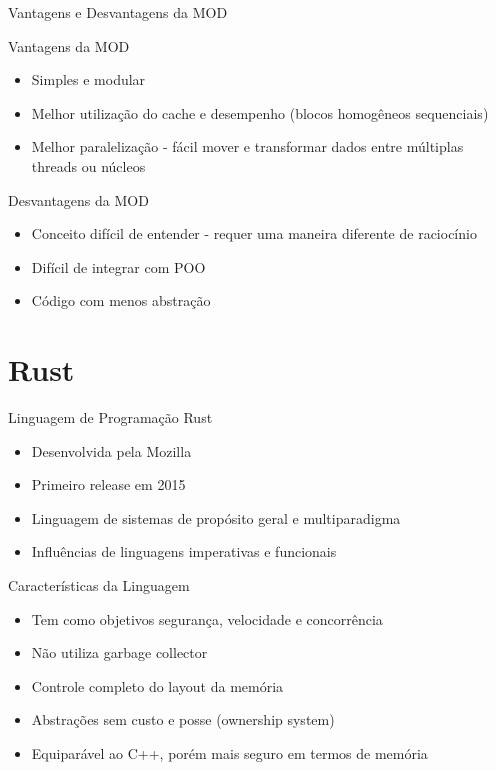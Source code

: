 \documentclass{beamer}
\begin{document}
\begin{frame}[t]{Vantagens e Desvantagens da MOD}
    \begin{minipage}[b]{0.4\textwidth}
        Vantagens da MOD
        \begin{itemize}
            \item Simples e modular
            \item Melhor utilização do cache e desempenho (blocos homogêneos sequenciais)
            \item Melhor paralelização - fácil mover e transformar dados entre múltiplas 
                threads ou núcleos
        \end{itemize}
    \end{minipage}
    \hspace{1.5cm}
    \begin{minipage}[b]{0.4\textwidth}
        Desvantagens da MOD
        \begin{itemize}
            \item Conceito difícil de entender - requer uma maneira diferente de 
                raciocínio
            \item Difícil de integrar com POO
            \item Código com menos abstração
        \end{itemize}
    \end{minipage}
\end{frame}

\section{Rust}

\frame{\tableofcontents[currentsection]}

\begin{frame}[t]{Linguagem de Programação Rust}
    \begin{itemize}
        \item Desenvolvida pela Mozilla
        \item Primeiro release em 2015
        \item Linguagem de sistemas de propósito geral e multiparadigma
        \item Influências de linguagens imperativas e funcionais
    \end{itemize}    
\end{frame}

\begin{frame}[t]{Características da Linguagem}
    \begin{itemize}
        \item Tem como objetivos segurança, velocidade e concorrência
        \item Não utiliza garbage collector
        \item Controle completo do layout da memória
        \item Abstrações sem custo e posse (ownership system)
        \item Equiparável ao C++, porém mais seguro em termos de memória
    \end{itemize}    
\end{frame}
\end{document}
